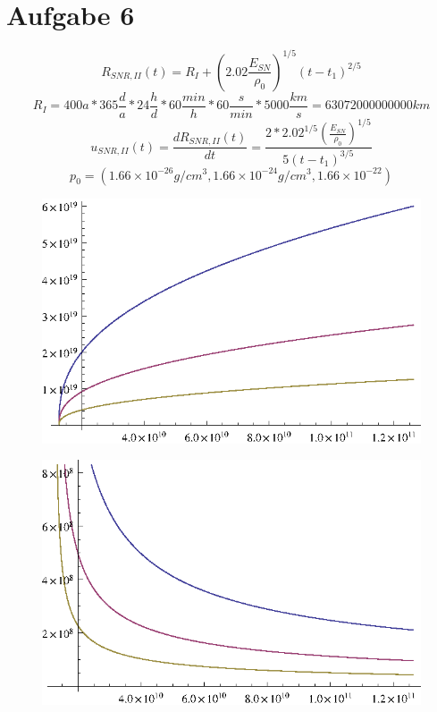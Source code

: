 \section{Aufgabe 6}
\begin{equation}
R_{SNR,II}(t)=R_I + \left( 2.02 \frac{E_{SN}}{\rho_0} \right) ^{1/5}(t-t_1)^{2/5}
\end{equation}
\begin{equation}
R_I=400 a * 365 \frac{d}{a} * 24 \frac{h}{d} * 60 \frac{min}{h} * 60 \frac{s}{min} * 5000 \frac{km}{s} = 63072000000000 km
\end{equation}
\begin{equation}
u_{SNR,II}(t) = \frac{dR_{SNR,II}(t)}{dt}=\frac{2 * 2.02^{1/5} \left( \frac{E_{SN}}{\rho_0} \right) ^{1/5}}{5(t-t_1)^{3/5}}
\end{equation}
\begin{equation}
p_0 = \left( 1.66 \times 10^{-26} g/cm^3, 1.66 \times 10^{-24} g/cm^3, 1.66 \times 10^{-22} \right)
\end{equation}
\begin{figure}[ht]
\begin{center}
\includegraphics{aufgabe6r.eps}
\end{center}
\end{figure}
\begin{figure}[ht]
\begin{center}
\includegraphics{aufgabe6u.eps}
\end{center}
\end{figure}


